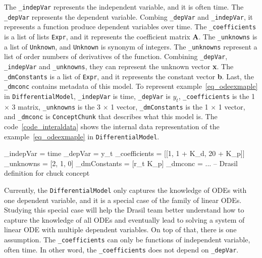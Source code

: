 The \verb|_indepVar| represents the independent variable, and it is often time. The \verb|_depVar| represents the dependent variable. Combing \verb|_depVar| and \verb|_indepVar|, it represents a function produce dependent variables over time. The \verb|_coefficients| is a list of lists \verb|Expr|, and it represents the coefficient matrix \textbf{A}. The \verb|_unknowns| is a list of \verb|Unknown|, and \verb|Unknown| is synonym of integers.
The \verb|_unknowns| represent a list of order numbers of derivatives of the function. Combining \verb|_depVar|, \verb|_indepVar| and \verb|_unknowns|, they can represent the unknown vector \textbf{x}. The \verb|_dmConstants| is a list of \verb|Expr|, and it represents the constant vector \textbf{b}. Last, the \verb|_dmconc| contains metadata of this model. To represent example~\ref{eq_odeexmaple} in \verb|DifferentialModel|, \verb|_indepVar| is time, \verb|_depVar| is $y_t$, \verb|_coefficients| is the 1 $\times$ 3 matrix, \verb|_unknowns| is the 3 $\times$ 1 vector, \verb|_dmConstants| is the 1 $\times$ 1 vector, and \verb|_dmconc| is \verb|ConceptChunk| that describes what this model is. The code~\ref{code_interaldata} shows the internal data representation of the example~\ref{eq_odeexmaple} in \verb|DifferentialModel|.

\begin{listing}[ht]
\begin{haskell1}
_indepVar = time
_depVar = y_t
_coefficients = [[1, 1 + K_d, 20 + K_p]]
_unknowns = [2, 1, 0]
_dmConstants = [r_t K_p]
_dmconc = ... -- Drasil definition for chuck concept
\end{haskell1}
\label{code_interaldata}
\end{listing}

Currently, the \verb|DifferentialModel| only captures the knowledge of ODEs with one dependent variable, and it is a special case of the family of linear ODEs. Studying this special case will help the Drasil team better understand how to capture the knowledge of all ODEs and eventually lead to solving a system of linear ODE with multiple dependent variables. On top of that, there is one assumption. The \verb|_coefficients| can only be functions of independent variable, often time. In other word, the \verb|_coefficients| does not depend on \verb|_depVar|.

